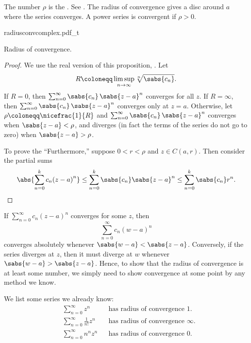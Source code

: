 The number $\rho$ is the \emph{}.
See .
The radius of convergence gives a disc around $a$ where the series converges.  A power series
is convergent if $\rho > 0$.
\begin{myfigureht}
{radiusconvcomplex.pdf_t}
\caption{Radius of convergence.\label{fig:radiusconvcomplex}}
\end{myfigureht}

\begin{proof}
We use the real version of this proposition,
.
Let
\begin{equation*}
R \coloneqq \limsup_{n\to\infty} \sqrt[n]{\sabs{c_n}} .
\end{equation*}
If $R = 0$, then
$\sum_{n=0}^\infty \sabs{c_n} \, \sabs{z-a}^n$ converges for all $z$.
If $R = \infty$, then
$\sum_{n=0}^\infty \sabs{c_n} \, \sabs{z-a}^n$ converges only at $z=a$.
Otherwise, let $\rho \coloneqq \nicefrac{1}{R}$ and
$\sum_{n=0}^\infty \sabs{c_n} \, \sabs{z-a}^n$ converges when
$\sabs{z-a} < \rho$, and diverges (in fact the terms of the series
do not go to zero) when $\sabs{z-a} > \rho$.

To prove the ``Furthermore,'' suppose
$0 < r < \rho$ and $z \in C(a,r)$.  Then
consider the partial sums
\begin{equation*}
\abs{\sum_{n=0}^k c_n {(z-a)}^n}
\leq
\sum_{n=0}^k \sabs{c_n} \sabs{z-a}^n
\leq
\sum_{n=0}^k \sabs{c_n} r^n . \qedhere
\end{equation*}
\end{proof}

If $\sum_{n=0}^\infty c_n {(z-a)}^n$ converges for some $z$, then
\begin{equation*}
\sum_{n=0}^\infty c_n {(w-a)}^n
\end{equation*}
converges absolutely whenever $\sabs{w-a} < \sabs{z-a}$.
Conversely, if the series diverges at $z$, then it must diverge at $w$
whenever $\sabs{w-a} > \sabs{z-a}$.
Hence, to show
that the radius of convergence is at least some number, we simply need to
show convergence at some point by any method we know.

\begin{example}
We list some series we already know:
\begin{align*}
& &
& \sum_{n=0}^\infty z^n
& & \text{has radius of convergence } 1.
& &
\\
& &
& \sum_{n=0}^\infty \frac{1}{n!} z^n
& & \text{has radius of convergence } \infty.
& &
\\
& &
& \sum_{n=0}^\infty n^n z^n
& & \text{has radius of convergence } 0.
& &
\end{align*}
\end{example}

